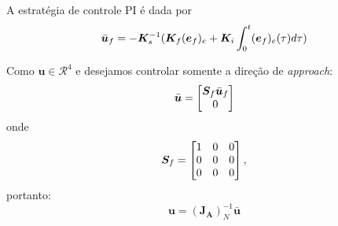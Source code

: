 A estratégia de controle PI é dada por
\begin{equation}
\bar{\bm{u}}_f = -\bm{K}_s^{-1} (\bm{K}_f (\bm{e}_f)_e + \bm{K}_i \int_0^t (\bm{e}_f)_e (\tau)d\tau)\\
\end{equation}

Como $\bm{u} \in \mathcal{R}^4$  e desejamos controlar somente a direção de \textit{approach}:
\begin{equation}
\bar{\bm{u}} = \begin{bmatrix} \bm{S}_f \bar{\bm{u}}_f \\ 0\end{bmatrix} 
\end{equation}
onde 
\begin{equation}
\bm{S}_f = \begin{bmatrix}
  1 & 0 & 0 \\
  0 & 0 & 0 \\
  0 & 0 & 0
\end{bmatrix},
\end{equation}
portanto:
\begin{equation}
\bm{u} = (\bm{J_A})_N^{-1} \bar{\bm{u}}
\end{equation}



